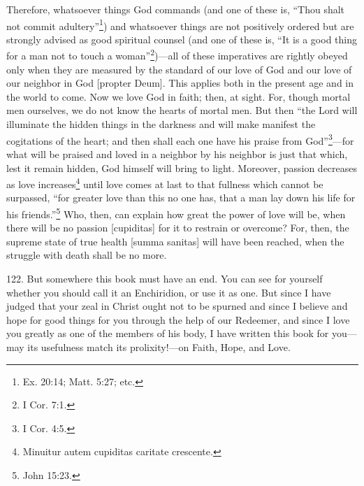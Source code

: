 Therefore, whatsoever things God commands (and one of these is, ``Thou shalt not commit adultery''\footnote{Ex. 20:14; Matt. 5:27; etc.}) and whatsoever things are not positively ordered but are strongly advised as good spiritual counsel (and one of these is, ``It is a good thing for a man not to touch a woman''\footnote{I Cor. 7:1.})—all of these imperatives are rightly obeyed only when they are measured by the standard of our love of God and our love of our neighbor in God [propter Deum]. This applies both in the present age and in the world to come. Now we love God in faith; then, at sight. For, though mortal men ourselves, we do not know the hearts of mortal men. But then ``the Lord will illuminate the hidden things in the darkness and will make manifest the cogitations of the heart; and then shall each one have his praise from God''\footnote{I Cor. 4:5.}—for what will be praised and loved in a neighbor by his neighbor is just that which, lest it remain hidden, God himself will bring to light. Moreover, passion decreases as love increases\footnote{Minuitur autem cupiditas caritate crescente.} until love comes at last to that fullness which cannot be surpassed, ``for greater love than this no one has, that a man lay down his life for his friends.''\footnote{John 15:23.} Who, then, can explain how great the power of love will be, when there will be no passion [cupiditas] for it to restrain or overcome? For, then, the supreme state of true health [summa sanitas] will have been reached, when the struggle with death shall be no more.


122. But somewhere this book must have an end. You can see for yourself whether you should call it an Enchiridion, or use it as one. But since I have judged that your zeal in Christ ought not to be spurned and since I believe and hope for good things for you through the help of our Redeemer, and since I love you greatly as one of the members of his body, I have written this book for you—may its usefulness match its prolixity!—on Faith, Hope, and Love.
